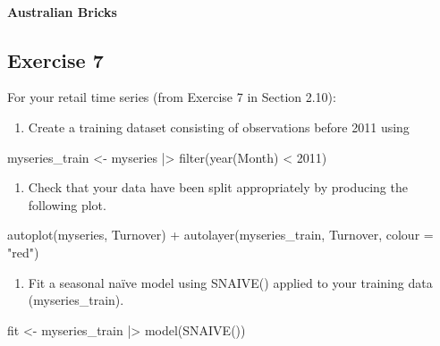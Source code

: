 \documentclass[
  11pt,
]{article}
\let\oldparagraph\paragraph
\renewcommand{\paragraph}[1]{\oldparagraph{#1}\mbox{}}
\newenvironment{Shaded}{\begin{snugshade}}{\end{snugshade}}
\newcommand{\NormalTok}[1]{\textcolor[rgb]{0.00,0.23,0.31}{#1}}
\providecommand{\tightlist}{%
  \setlength{\itemsep}{0pt}\setlength{\parskip}{0pt}}\usepackage{longtable,booktabs,array}
\begin{document}
\paragraph{Australian Bricks}\label{australian-bricks}

\subsection{Exercise 7}\label{exercise-7}

For your retail time series (from Exercise 7 in Section 2.10):

\begin{enumerate}
\def\labelenumi{\alph{enumi}.}
\tightlist
\item
  Create a training dataset consisting of observations before 2011 using
\end{enumerate}

\begin{Shaded}
\begin{Highlighting}[]
\NormalTok{myseries\_train \textless{}{-} myseries |\textgreater{}}
\NormalTok{  filter(year(Month) \textless{} 2011)}
\end{Highlighting}
\end{Shaded}

\begin{enumerate}
\def\labelenumi{\alph{enumi}.}
\setcounter{enumi}{1}
\tightlist
\item
  Check that your data have been split appropriately by producing the
  following plot.
\end{enumerate}

\begin{Shaded}
\begin{Highlighting}[]
\NormalTok{autoplot(myseries, Turnover) +}
\NormalTok{  autolayer(myseries\_train, Turnover, colour = "red")}
\end{Highlighting}
\end{Shaded}

\begin{enumerate}
\def\labelenumi{\alph{enumi}.}
\setcounter{enumi}{2}
\tightlist
\item
  Fit a seasonal naïve model using SNAIVE() applied to your training
  data (myseries\_train).
\end{enumerate}

\begin{Shaded}
\begin{Highlighting}[]
\NormalTok{fit \textless{}{-} myseries\_train |\textgreater{}}
\NormalTok{  model(SNAIVE())}
\end{Highlighting}
\end{Shaded}
\end{document}
